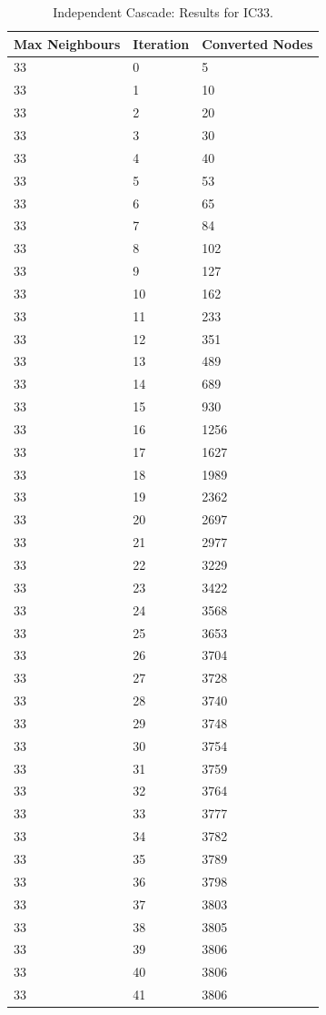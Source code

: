 \begin{table}
\centering
\begin{tabular}{|l||l|l|}
\hline
Max Neighbours & Iteration & Converted Nodes \\
\hline
33 & 0 & 5 \\
33 & 1 & 10 \\
33 & 2 & 20 \\
33 & 3 & 30 \\
33 & 4 & 40 \\
33 & 5 & 53 \\
33 & 6 & 65 \\
33 & 7 & 84 \\
33 & 8 & 102 \\
33 & 9 & 127 \\
33 & 10 & 162 \\
33 & 11 & 233 \\
33 & 12 & 351 \\
33 & 13 & 489 \\
33 & 14 & 689 \\
33 & 15 & 930 \\
33 & 16 & 1256 \\
33 & 17 & 1627 \\
33 & 18 & 1989 \\
33 & 19 & 2362 \\
33 & 20 & 2697 \\
33 & 21 & 2977 \\
33 & 22 & 3229 \\
33 & 23 & 3422 \\
33 & 24 & 3568 \\
33 & 25 & 3653 \\
33 & 26 & 3704 \\
33 & 27 & 3728 \\
33 & 28 & 3740 \\
33 & 29 & 3748 \\
33 & 30 & 3754 \\
33 & 31 & 3759 \\
33 & 32 & 3764 \\
33 & 33 & 3777 \\
33 & 34 & 3782 \\
33 & 35 & 3789 \\
33 & 36 & 3798 \\
33 & 37 & 3803 \\
33 & 38 & 3805 \\
33 & 39 & 3806 \\
33 & 40 & 3806 \\
33 & 41 & 3806 \\
\hline
\end{tabular}
\caption{Independent Cascade: Results for IC33.}
\label{tab:ic_results33}
\end{table}

